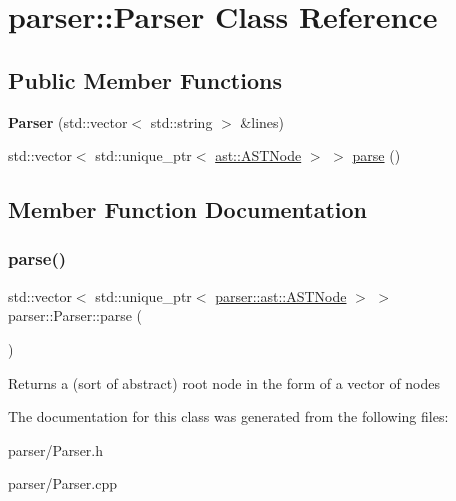 \hypertarget{classparser_1_1Parser}{}\section{parser\+:\+:Parser Class Reference}
\label{classparser_1_1Parser}
\subsection*{Public Member Functions}
\begin{DoxyCompactItemize}
\item 
\mbox{\label{classparser_1_1Parser_a18234ace1965274d1ff87ab837e8e919}} 
{\bfseries Parser} (std\+::vector$<$ std\+::string $>$ \&lines)
\item 
std\+::vector$<$ std\+::unique\+\_\+ptr$<$ \hyperlink{classparser_1_1ast_1_1ASTNode}{ast\+::\+A\+S\+T\+Node} $>$ $>$ \hyperlink{classparser_1_1Parser_afc66d21a0a64957f0d982026c319b80e}{parse} ()
\end{DoxyCompactItemize}


\subsection{Member Function Documentation}
\mbox{\label{classparser_1_1Parser_afc66d21a0a64957f0d982026c319b80e}} 
\subsubsection{\texorpdfstring{parse()}{parse()}}
{\footnotesize\ttfamily std\+::vector$<$ std\+::unique\+\_\+ptr$<$ \hyperlink{classparser_1_1ast_1_1ASTNode}{parser\+::ast\+::\+A\+S\+T\+Node} $>$ $>$ parser\+::\+Parser\+::parse (\begin{DoxyParamCaption}{ }\end{DoxyParamCaption})}

\begin{DoxyReturn}{Returns}
a (sort of abstract) root node in the form of a vector of nodes 
\end{DoxyReturn}


The documentation for this class was generated from the following files\+:\begin{DoxyCompactItemize}
\item 
parser/Parser.\+h\item 
parser/Parser.\+cpp\end{DoxyCompactItemize}
